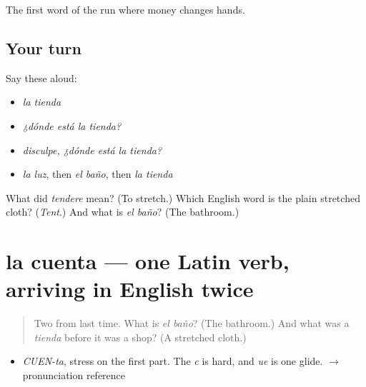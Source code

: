 \begin{grammarlens}[title={What you've built}]
The first word of the run where money changes hands.
\end{grammarlens}

\subsection*{Your turn}
Say these aloud:

\begin{itemize}
\raggedright
  \item \emph{la tienda}
  \item \emph{¿dónde está la tienda?}
  \item \emph{disculpe, ¿dónde está la tienda?}
  \item \emph{la luz}, then \emph{el baño}, then \emph{la tienda}
\end{itemize}

\begin{tcolorbox}[breakable,colback=teal!4,colframe=teal!35!black,title={Before you move on}]
What did \emph{tendere} mean? (To stretch.) Which English word is the plain stretched cloth? (\emph{Tent}.) And what is \emph{el baño}? (The bathroom.)
\end{tcolorbox}
\section[la cuenta]{la cuenta — one Latin verb, arriving in English twice}

\label{lesson:ES-C311-cuenta}



\begin{quote}
Two from last time. What is \emph{el baño}? (The bathroom.) And what was a \emph{tienda} before it was a shop? (A stretched cloth.)
\end{quote}

\begin{sounds}
\begin{itemize}
\raggedright
  \item \emph{CUEN-ta}, stress on the first part. The \emph{c} is hard, and \emph{ue} is one glide. $\to$ pronunciation reference
\end{itemize}
\end{sounds}

